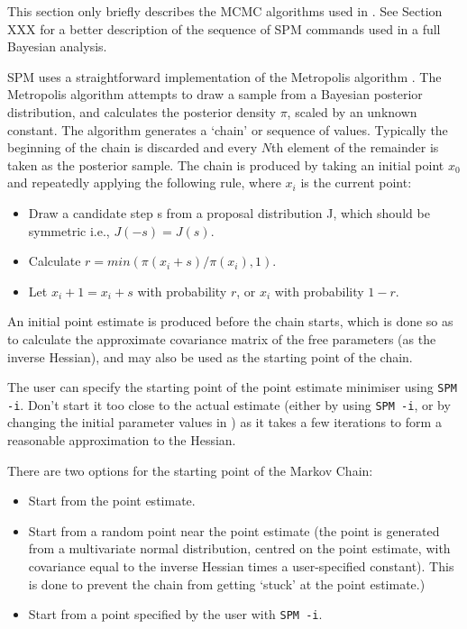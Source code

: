 This section only briefly describes the MCMC algorithms used in \SPM. See Section XXX for a better description of the sequence of SPM commands used in a full Bayesian analysis.

SPM uses a straightforward implementation of the Metropolis algorithm \citep{823,143}. The Metropolis algorithm attempts to draw a sample from a Bayesian posterior distribution, and calculates the posterior density $\pi$, scaled by an unknown constant. The algorithm generates a `chain' or sequence of values. Typically the beginning of the chain is discarded and every $N$th element of the remainder is taken as the posterior sample. The chain is produced by taking an initial point $x_0$ and repeatedly applying the following rule, where $x_i$ is the current point: 

\begin{itemize}
\item Draw a candidate step s from a proposal distribution J, which should be symmetric i.e., $J(-s)=J(s)$.

\item Calculate $r=min(\pi(x_i+s)/\pi(x_i),1)$. 

\item Let $x_i+1=x_i+s$ with probability $r$, or $x_i$ with probability $1-r$.
\end{itemize}

An initial point estimate is produced before the chain starts, which is done so as to calculate the approximate covariance matrix of the free parameters (as the inverse Hessian), and may also be used as the starting point of the chain. 

The user can specify the starting point of the point estimate minimiser using \texttt{SPM -i}. Don't start it too close to the actual estimate (either by using \texttt{SPM -i}, or by changing the initial parameter values in \config) as it takes a few iterations to form a reasonable approximation to the Hessian. 

There are two options for the starting point of the Markov Chain: 

\begin{itemize}
\item Start from the point estimate.

\item Start from a random point near the point estimate (the point is generated from a multivariate normal distribution, centred on the point estimate, with covariance equal to the inverse Hessian times a user-specified constant). This is done to prevent the chain from getting `stuck' at the point estimate.)

\item Start from a point specified by the user with \texttt{SPM -i}.
\end{itemize}

